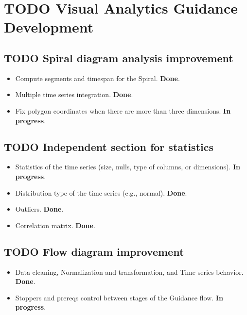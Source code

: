 \documentclass[a4paper]{article}
\begin{document}
\section{{\bfseries\sffamily TODO} Visual Analytics Guidance Development}
\label{sec:org7982db7}

\subsection{{\bfseries\sffamily TODO} Spiral diagram analysis improvement}
\label{sec:org69869da}

\begin{itemize}
\item Compute segments and timespan for the Spiral. \textbf{Done}.

\item Multiple time series integration. \textbf{Done}.

\item Fix polygon coordinates when there are more than three dimensions. \textbf{In progress}.
\end{itemize}

\subsection{{\bfseries\sffamily TODO} Independent section for statistics}
\label{sec:org85c0a43}

\begin{itemize}
\item Statistics of the time series (size, nulls, type of columns, or dimensions). \textbf{In progress}.

\item Distribution type of the time series (e.g., normal). \textbf{Done}.

\item Outliers. \textbf{Done}.

\item Correlation matrix. \textbf{Done}.
\end{itemize}

\subsection{{\bfseries\sffamily TODO} Flow diagram improvement}
\label{sec:org55aacb2}

\begin{itemize}
\item Data cleaning, Normalization and transformation, and Time-series behavior. \textbf{Done}.

\item Stoppers and prereqs control between stages of the Guidance flow. \textbf{In progress}.
\end{itemize}
\end{document}
